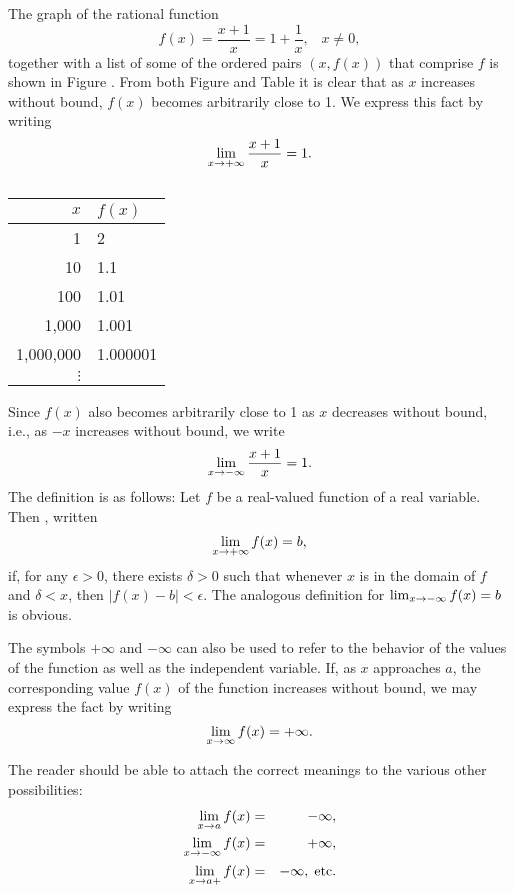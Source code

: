 The graph of the rational function 
\[
f(x) = \frac{x + 1}{x} = 1 + \frac{1}{x}, \;\;\; x \neq 0,
\]
together with a list of some of the ordered pairs $(x,f(x))$
that comprise $f$ is shown in Figure .
From both Figure  and Table 
it is clear that as $x$ increases without bound,
$f(x)$ becomes arbitrarily close to 1.
We express this fact by writing 
\[
\lim_{x \rightarrow +\infty} {\frac{x + 1}{x}} = 1.  
\]
\begin{table}\label{table 1.6}
\centering
\begin{tabular}{r|l} \hline
 $x$       & $f(x)$  \vspace {1ex} \\ \hline
1            &  2   \\
10          &  1.1   \\
100        &  1.01    \\
1,000      &  1.001    \\
1,000,000  &  1.000001 \\
 $\vdots $      &          \\ \hline  
\end{tabular}
\caption{}
\end{table}
Since $f(x)$ also becomes arbitrarily close to 1
as $x$ decreases without bound,
i.e., as $-x$ increases without bound,
we write 
\[
\lim_{x \rightarrow {-\infty}} {\frac{x + 1}{x}} = 1.
\]
The definition is as follows:
Let $f$ be a real-valued function of a real variable.
Then ,
written 
\[
\lim_{x \rightarrow {+\infty}} {f(x)} = b,
\]
if, for any $\epsilon > 0$,
there exists $\delta > 0$ such that
whenever $x$ is in the domain of $f$
and $\delta < x$,
then $|f(x) - b| < \epsilon$.
The analogous definition for
$\lim_{x \rightarrow -\infty}f(x) = b$ is obvious.

The symbols $+\infty$ and $-\infty$
can also be used to refer to
the behavior of the values of the function
as well as the independent variable.
If, as $x$ approaches $a$,
the corresponding value $f(x)$ of the function increases without bound,
we may express the fact by writing
\[
\lim_{x \rightarrow \infty} f(x) = + \infty.
\]

The reader should be able to attach the correct meanings
to the various other possibilities:  
\begin{eqnarray*}
\lim_{x \rightarrow a} f(x) &=& - \infty, \\
\lim_{x \rightarrow -\infty} f(x) &=& + \infty, \\
\lim_{x \rightarrow a+} f(x) &=& - \infty, \; \mbox{etc.}
\end{eqnarray*}

